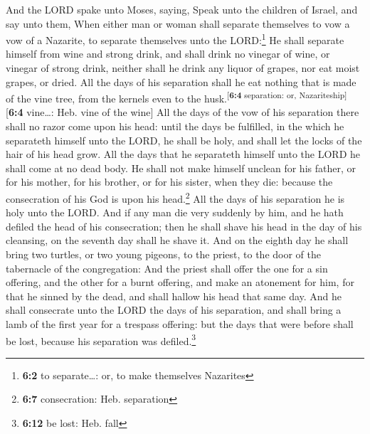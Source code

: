  And the LORD spake unto Moses, saying, 
Speak unto the children of Israel, and say unto them, When either man or
woman shall separate themselves to vow a vow of a Nazarite, to separate
themselves unto the LORD:\footnote{\textbf{6:2} to separate\ldots: or,
  to make themselves Nazarites}  He shall separate himself
from wine and strong drink, and shall drink no vinegar of wine, or
vinegar of strong drink, neither shall he drink any liquor of grapes,
nor eat moist grapes, or dried.  All the days of his
separation shall he eat nothing that is made of the vine tree, from the
kernels even to the husk.\textsuperscript{{[}\textbf{6:4} separation:
or, Nazariteship{]}}{[}\textbf{6:4} vine\ldots: Heb. vine of the wine{]}
 All the days of the vow of his separation there shall no
razor come upon his head: until the days be fulfilled, in the which he
separateth himself unto the LORD, he shall be holy, and shall let the
locks of the hair of his head grow.  All the days that he
separateth himself unto the LORD he shall come at no dead body.
 He shall not make himself unclean for his father, or for
his mother, for his brother, or for his sister, when they die: because
the consecration of his God is upon his head.\footnote{\textbf{6:7}
  consecration: Heb. separation}  All the days of his
separation he is holy unto the LORD.  And if any man die
very suddenly by him, and he hath defiled the head of his consecration;
then he shall shave his head in the day of his cleansing, on the seventh
day shall he shave it.  And on the eighth day he shall
bring two turtles, or two young pigeons, to the priest, to the door of
the tabernacle of the congregation:  And the priest shall
offer the one for a sin offering, and the other for a burnt offering,
and make an atonement for him, for that he sinned by the dead, and shall
hallow his head that same day.  And he shall consecrate
unto the LORD the days of his separation, and shall bring a lamb of the
first year for a trespass offering: but the days that were before shall
be lost, because his separation was defiled.\footnote{\textbf{6:12} be
  lost: Heb. fall}

